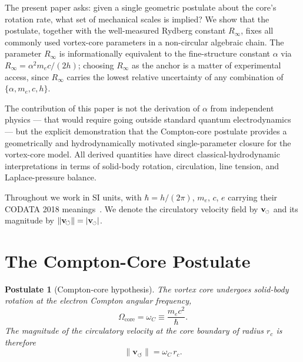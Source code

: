 \documentclass[aps,pra,preprint,longbibliography,nofootinbib]{revtex4-2}
\newtheorem{postulate}{Postulate}
\newcommand{\rotarrow}{%
  \mathchoice{\mkern-2mu\scriptstyle\boldsymbol{\circlearrowleft}}%
             {\mkern-2mu\scriptstyle\boldsymbol{\circlearrowleft}}%
             {\mkern-2mu\scriptscriptstyle\boldsymbol{\circlearrowleft}}%
             {\mkern-2mu\scriptscriptstyle\boldsymbol{\circlearrowleft}}}
\newcommand{\vc}{\mathbf{v}_{\rotarrow}}        %
\newcommand{\vnorm}{\lVert\mathbf{v}_{\!\boldsymbol{\circlearrowleft}}\rVert} %
\newcommand{\rc}{r_c}                            %
\newcommand{\omC}{\omega_C}                      %
\newcommand{\Rinf}{R_\infty}                     %
\begin{document}
The present paper asks: given a single geometric postulate about the
core's rotation rate, what set of mechanical scales is implied?
We show that the postulate, together with the well-measured Rydberg
constant $\Rinf$, fixes all commonly used vortex-core parameters in a
non-circular algebraic chain.
The parameter $\Rinf$ is informationally equivalent to the
fine-structure constant $\alpha$ via $\Rinf = \alpha^2 m_e c/(2h)$;
choosing $\Rinf$ as the anchor is a matter of experimental access,
since $\Rinf$ carries the lowest relative uncertainty of any
combination of $\{\alpha, m_e, c, h\}$.

The contribution of this paper is not the derivation of $\alpha$ from
independent physics — that would require going outside standard
quantum electrodynamics — but the explicit demonstration that the
Compton-core postulate provides a geometrically and
hydrodynamically motivated single-parameter closure for the
vortex-core model.
All derived quantities have direct classical-hydrodynamic
interpretations in terms of solid-body rotation, circulation,
line tension, and Laplace-pressure balance.

Throughout we work in SI units, with $\hbar = h/(2\pi)$, $m_e$,
$c$, $e$ carrying their CODATA 2018 meanings~\cite{MohrTaylor2018}.
We denote the circulatory velocity field by $\vc$ and its magnitude
by $\vnorm = |\vc|$.

\section{The Compton-Core Postulate}
\label{sec:postulate}

\begin{postulate}[Compton-core hypothesis]
\label{post:compton}
The vortex core undergoes solid-body rotation at the electron
Compton angular frequency,
\begin{equation}
  \Omega_{\mathrm{core}} = \omC \equiv \frac{m_e c^2}{\hbar}.
  \label{eq:postulate}
\end{equation}
The magnitude of the circulatory velocity at the core boundary
of radius $\rc$ is therefore
\begin{equation}
  \vnorm = \omC\,\rc.
  \label{eq:vc_rc_link}
\end{equation}
\end{postulate}
\end{document}
